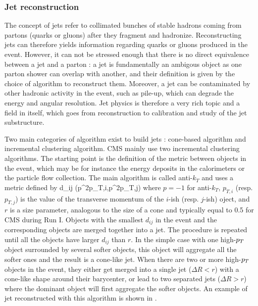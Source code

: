 
        \subsubsection{Jet reconstruction \label{sec:jetReconstruction}}

        The concept of jets refer to collimated bunches of stable hadrons coming from partons
        (quarks or gluons) after they fragment and hadronize. Reconstructing jets can
        therefore yields information regarding quarks or gluons produced in the event.
        However, it can not be stressed enough that there is no direct equivalence between
        a jet and a parton : a jet is fundamentally an ambigous object as one parton
        shower can overlap with another, and their definition is given by the choice
        of algorithm to reconstruct them. Moreover, a jet can be contaminated by other
        hadronic activity in the event, such as pile-up, which can degrade the energy
        and angular resolution. Jet physics is therefore a very rich topic and a field
        in itself, which goes from reconstruction to calibration and study of the jet
        substructure.

        Two main categories of algorithm exist to build jets : cone-based algorithm and
        incremental clustering algorithm. CMS mainly use two incremental clustering
        algorithms. The starting point is the definition of the metric between objects in the
        event, which may be for instance the energy deposits in the calorimeters or the
        particle flow collection. The main algorithm is called anti-$k_T$ and uses a metric
        defined by
        {
            d_{ij}  {}(p^{2p}_{T,i},p^{2p}_{T,j}) 
        }
        where $p = -1$ for anti-$k_T$, $p_{T,i}$ (resp. $p_{T,j}$) is the value of the transverse momentum of
        the $i$-ish (resp. $j$-ish) oject, and $r$ is a size parameter, analogous to the size of a cone and
        typically equal to 0.5 for CMS during Run I. Objects with the smallest
        $d_{ij}$ in the event and the corresponding objects are merged together into a
        jet. The procedure is repeated until all the objects have larger $d_{ij}$ than
        $r$. In the
        simple case with one high-$p_T$ object surrounded by several softer objects, this
        object will aggregate all the softer ones and the result is a cone-like jet. When
        there are two or more high-$p_T$ objects in the event, they either get merged into
        a single jet ($\Delta R < r$) with a cone-like shape around their barycenter, or
        lead to two separated jets ($\Delta R > r$) where the dominant object will first
        aggregate the softer objects. An example of jet reconstructed with this algorithm
        is shown in .


